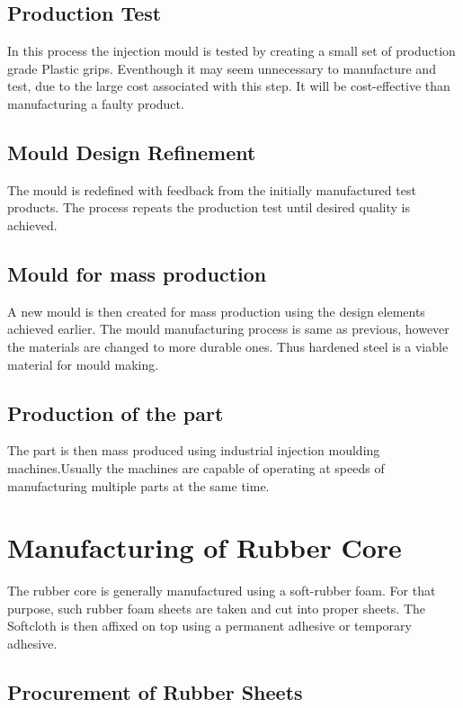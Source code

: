 \documentclass[12pt,a4paper,oneside]{article}
\begin{document}
\subsection{Production Test}

In this process the injection mould is tested by creating a small set of production grade Plastic grips. Eventhough it may seem unnecessary to manufacture and test, due to the large cost associated with this step. It will be cost-effective than manufacturing a faulty product.

\subsection{Mould Design Refinement}

The mould is redefined with feedback from the initially manufactured test products. The process repeats the production test until desired quality is achieved.

\subsection{Mould for mass production}

A new mould is then created for mass production using the design elements achieved earlier. The mould manufacturing process is same as previous, however the materials are changed to more durable ones. Thus hardened steel is a viable material for mould making. 
\cite{2018:Injection}


\subsection{Production of the part}

The part is then mass produced using industrial injection moulding machines.Usually the machines are capable of operating at speeds of manufacturing multiple parts at the same time.  


\newpage

\section{Manufacturing of Rubber Core}

The rubber core is generally manufactured using a soft-rubber foam. For that purpose, such rubber foam sheets are taken and cut into proper sheets. The Softcloth is then affixed on top using a permanent adhesive or temporary adhesive. 

\subsection{Procurement of Rubber Sheets}
\end{document}
